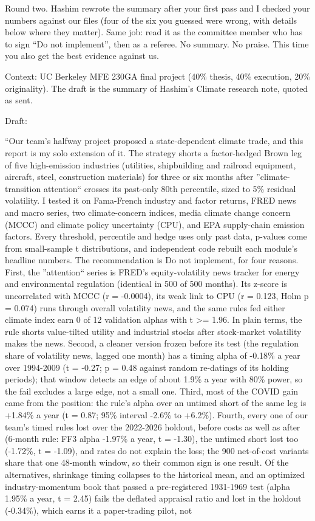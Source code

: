\par\noindent Round two. Hashim rewrote the summary after your first pass and I checked your numbers against our files (four of the six you guessed were wrong, with details below where they matter). Same job: read it as the committee member who has to sign ``Do not implement'', then as a referee. No summary. No praise. This time you also get the best evidence against us.
\medskip
\par\noindent Context: UC Berkeley MFE 230GA final project (40\% thesis, 40\% execution, 20\% originality). The draft is the summary of Hashim's Climate research note, quoted as sent.
\medskip
\par\noindent Draft:
\medskip
\par\noindent ``Our team's halfway project proposed a state-dependent climate trade, and this report is my solo extension of it. The strategy shorts a factor-hedged Brown leg of five high-emission industries (utilities, shipbuilding and railroad equipment, aircraft, steel, construction materials) for three or six months after ''climate-transition attention`` crosses its past-only 80th percentile, sized to 5\% residual volatility. I tested it on Fama-French industry and factor returns, FRED news and macro series, two climate-concern indices, media climate change concern (MCCC) and climate policy uncertainty (CPU), and EPA supply-chain emission factors. Every threshold, percentile and hedge uses only past data, p-values come from small-sample t distributions, and independent code rebuilt each module's headline numbers. The recommendation is Do not implement, for four reasons. First, the ''attention`` series is FRED's equity-volatility news tracker for energy and environmental regulation (identical in 500 of 500 months). Its z-score is uncorrelated with MCCC (r = -0.0004), its weak link to CPU (r = 0.123, Holm p = 0.074) runs through overall volatility news, and the same rules fed either climate index earn 0 of 12 validation alphas with t \textgreater{}= 1.96. In plain terms, the rule shorts value-tilted utility and industrial stocks after stock-market volatility makes the news. Second, a cleaner version frozen before its test (the regulation share of volatility news, lagged one month) has a timing alpha of -0.18\% a year over 1994-2009 (t = -0.27; p = 0.48 against random re-datings of its holding periods); that window detects an edge of about 1.9\% a year with 80\% power, so the fail excludes a large edge, not a small one. Third, most of the COVID gain came from the position: the rule's alpha over an untimed short of the same leg is +1.84\% a year (t = 0.87; 95\% interval -2.6\% to +6.2\%). Fourth, every one of our team's timed rules lost over the 2022-2026 holdout, before costs as well as after (6-month rule: FF3 alpha -1.97\% a year, t = -1.30), the untimed short lost too (-1.72\%, t = -1.09), and rates do not explain the loss; the 900 net-of-cost variants share that one 48-month window, so their common sign is one result. Of the alternatives, shrinkage timing collapses to the historical mean, and an optimized industry-momentum book that passed a pre-registered 1931-1969 test (alpha 1.95\% a year, t = 2.45) fails the deflated appraisal ratio and lost in the holdout (-0.34\%), which earns it a paper-trading pilot, not 